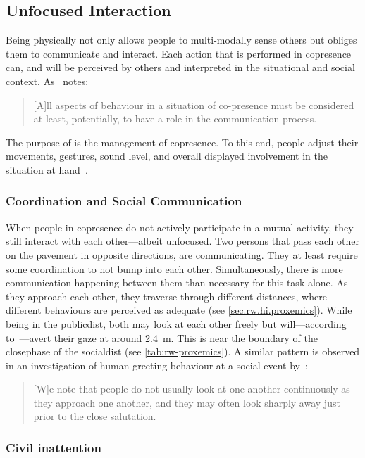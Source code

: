 \subsection{Unfocused Interaction}\label{sec.rw.hi.unfocused}

Being physically  not only allows people to multi-modally sense others but obliges them to communicate and interact.
Each action that is performed in \gls{copresence} can, and will be perceived by others and interpreted in the situational and social context.
As~ notes: \blockcquote[p. 27]{kendon1990}{[A]ll aspects of behaviour in a situation of co-presence must be considered at least, potentially, to have a role in the communication process.}
The purpose of is the management of \gls{copresence}.
To this end, people adjust their movements, gestures, sound level, and overall displayed involvement in the situation at hand~\cite[]{goffman1963}.

\subsubsection{Coordination and Social Communication}

When people in \gls{copresence} do not actively participate in a mutual activity, they still interact with each other---albeit unfocused.
Two persons that pass each other on the pavement in opposite directions, are communicating.
They at least require some coordination to not bump into each other.
Simultaneously, there is more communication happening between them than necessary for this task alone.
As they approach each other, they traverse through different  distances, where different behaviours are perceived as adequate (see \cref{sec.rw.hi.proxemics}).
While being in the \gls{publicdist}, both may look at each other freely but will---according to~---avert their gaze at around \SI{2.4}{\meter}.
This is near the boundary of the \gls{closephase} of the \gls{socialdist} (see \cref{tab:rw-proxemics}).
A similar pattern is observed in an investigation of human greeting behaviour at a social event by~\citeauthor*{kendon1990}:
\blockcquote[p. 163]{kendon1990}{[W]e note that people do not usually look at one another continuously as they approach one another, and they may often look sharply away just prior to the close salutation.}

\subsubsection{Civil inattention}\label{sec.rw.hi.unfocused.inatt}

